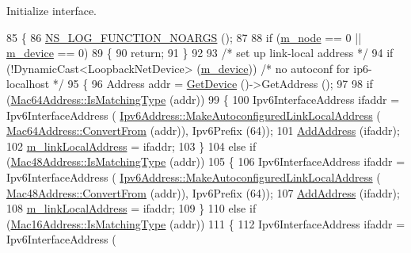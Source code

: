 Initialize interface. 


\begin{DoxyCode}
85 \{
86   \hyperlink{log-macros-disabled_8h_a8f7e4afc291c9d29a65c18ac1f79197b}{NS\_LOG\_FUNCTION\_NOARGS} ();
87 
88   \textcolor{keywordflow}{if} (\hyperlink{classns3_1_1Ipv6Interface_abc501f6da776acb53e65d8e657813d60}{m\_node} == 0 || \hyperlink{classns3_1_1Ipv6Interface_a1330429d5db7b31fc0d5fe16609d8c61}{m\_device} == 0)
89     \{
90       \textcolor{keywordflow}{return};
91     \}
92 
93   \textcolor{comment}{/* set up link-local address */}
94   \textcolor{keywordflow}{if} (!DynamicCast<LoopbackNetDevice> (\hyperlink{classns3_1_1Ipv6Interface_a1330429d5db7b31fc0d5fe16609d8c61}{m\_device})) \textcolor{comment}{/* no autoconf for ip6-localhost */}
95     \{
96       Address addr = \hyperlink{classns3_1_1Ipv6Interface_a31e06ee5ec327437ab37dddab3c85807}{GetDevice} ()->GetAddress ();
97 
98       \textcolor{keywordflow}{if} (\hyperlink{classns3_1_1Mac64Address_a50014d1350f72b89857f0262be927073}{Mac64Address::IsMatchingType} (addr))
99         \{
100           Ipv6InterfaceAddress ifaddr = Ipv6InterfaceAddress (
      \hyperlink{classns3_1_1Ipv6Address_af57fd659aa3c06013ce1b75fb97f9fc5}{Ipv6Address::MakeAutoconfiguredLinkLocalAddress} (
      \hyperlink{classns3_1_1Mac64Address_a9d73aef28cf6b6edf423b418ce014b10}{Mac64Address::ConvertFrom} (addr)), Ipv6Prefix (64));
101           \hyperlink{classns3_1_1Ipv6Interface_a8faa5a72b30720eb01f9fc1d1113ad19}{AddAddress} (ifaddr);
102           \hyperlink{classns3_1_1Ipv6Interface_ab726d86b96feb17cf53c165d7062c4e2}{m\_linkLocalAddress} = ifaddr;
103         \}
104       \textcolor{keywordflow}{else} \textcolor{keywordflow}{if} (\hyperlink{classns3_1_1Mac48Address_a55cc1e3c6aa63fd1a4f8f7d9be4ae182}{Mac48Address::IsMatchingType} (addr))
105         \{
106           Ipv6InterfaceAddress ifaddr = Ipv6InterfaceAddress (
      \hyperlink{classns3_1_1Ipv6Address_af57fd659aa3c06013ce1b75fb97f9fc5}{Ipv6Address::MakeAutoconfiguredLinkLocalAddress} (
      \hyperlink{classns3_1_1Mac48Address_a911ce13603a9ef837545a032b6523ae4}{Mac48Address::ConvertFrom} (addr)), Ipv6Prefix (64));
107           \hyperlink{classns3_1_1Ipv6Interface_a8faa5a72b30720eb01f9fc1d1113ad19}{AddAddress} (ifaddr);
108           \hyperlink{classns3_1_1Ipv6Interface_ab726d86b96feb17cf53c165d7062c4e2}{m\_linkLocalAddress} = ifaddr;
109         \}
110       \textcolor{keywordflow}{else} \textcolor{keywordflow}{if} (\hyperlink{classns3_1_1Mac16Address_a2d7aa9e24afc8e02a25ab449b0b99b1f}{Mac16Address::IsMatchingType} (addr))
111         \{
112           Ipv6InterfaceAddress ifaddr = Ipv6InterfaceAddress (

\end{DoxyCode}
